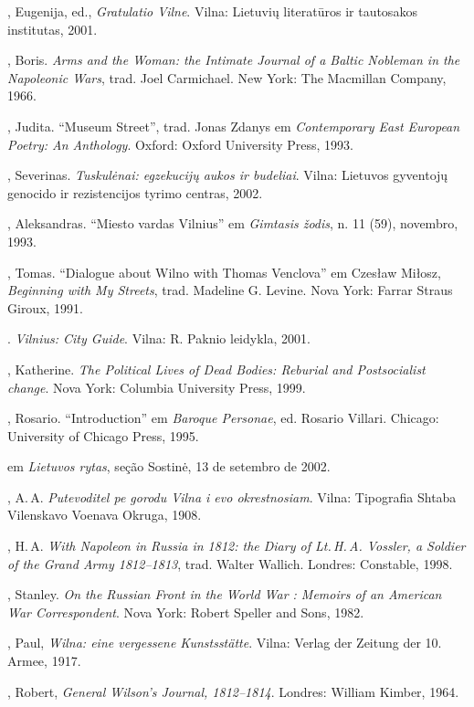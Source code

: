 \begin{bibliohedra}
  , Eugenija, ed., \textit{Gratulatio Vilne}. Vilna: Lietuvių
  literatūros ir tautosakos institutas, 2001.

  , Boris. \textit{Arms and the Woman: the Intimate Journal of a
  Baltic Nobleman in the Napoleonic Wars}, trad. Joel Carmichael. New
  York: The Macmillan Company, 1966.

  , Judita. ``Museum Street'', trad. Jonas Zdanys em
  \textit{Contemporary East European Poetry: An Anthology}. Oxford: Oxford University Press, 1993.

  , Severinas. \textit{Tuskulėnai: egzekucijų aukos ir budeliai}.
  Vilna: Lietuvos gyventojų genocido ir rezistencijos tyrimo centras,
  2002.


, Aleksandras. ``Miesto vardas Vilnius'' em \textit{Gimtasis
žodis}, n. 11 (59), novembro, 1993.

, Tomas. ``Dialogue about Wilno with Thomas Venclova'' em
Czesław Miłosz, \textit{Beginning with My Streets}, trad. Madeline G.
Levine. Nova York: Farrar Straus Giroux, 1991.

\titidem. \textit{Vilnius: City Guide}. Vilna: R. Paknio
leidykla, 2001.

, Katherine. \textit{The Political Lives of Dead Bodies: Reburial
and Postsocialist change}. Nova York: Columbia University Press, 1999.

, Rosario. ``Introduction'' em \textit{Baroque Personae}, ed.
Rosario Villari. Chicago: University of Chicago Press, 1995.

 em \textit{Lietuvos rytas}, seção
Sostinė, 13 de setembro de 2002.

, A.\,A. \textit{Putevoditel pe gorodu Vilna i evo okrestnosiam}.
Vilna: Tipografia Shtaba Vilenskavo Voenava Okruga, 1908.

, H.\,A. \textit{With Napoleon in Russia in 1812: the Diary of Lt.\,H.\,A. Vossler, a Soldier of the Grand Army 1812--1813}, trad. Walter
Wallich. Londres: Constable, 1998.

, Stanley. \textit{On the Russian Front in the World War :
Memoirs of an American War Correspondent}. Nova York: Robert Speller and
Sons, 1982.

, Paul, \textit{Wilna: eine vergessene Kunstsstätte}. Vilna: Verlag
der Zeitung der 10. Armee, 1917.

, Robert, \textit{General Wilson's Journal, 1812--1814}. Londres: William Kimber, 1964.


\end{bibliohedra}
